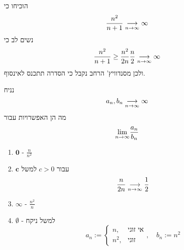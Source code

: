 \documentclass{article}
\begin{document}
\begin{exercise}
הוכיחו כי
\[\frac{n^2}{n+1}\underset{n\rightarrow\infty}{\longrightarrow} \infty\]
נשים לב כי
\[\frac{n^2}{n+1}\geq \frac{n^2}{2n}\frac{n}{2}\underset{n\rightarrow\infty}{\longrightarrow}\infty\]
ולכן מסנדוויץ' הרחב נקבל כי הסדרה תתכנס לאינסוף.
\end{exercise}

נניח 
\[a_n,b_n\underset{n\rightarrow\infty}{\longrightarrow} \infty\]
מה הן האפשרויות עבור 
\[\underset{n\rightarrow\infty}{\lim} \frac{a_n}{b_n}\]

\begin{enumerate}
\item $\mathbf{0}$ - $\frac{n}{n^2}$
\item $\mathbf{c}$
עבור 
$c>0$
למשל 
\[\frac{n}{2n} \underset{n\rightarrow\infty}{\longrightarrow}\frac{1}{2}\]
\item $\mathbf{\infty}$ - $\frac{n^2}{n}$
\item $\emptyset$ - 
למשל ניקח 
\[a_n:=\begin{cases}n, &\text{אי זוגי} \\ n^2, & \text{זוגי} \end{cases}, \quad b_n:=n^2\]
\end{enumerate}
\end{document}
